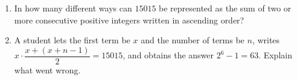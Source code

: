 \begin{enumerate}
\item[(a)] In how many different ways can $15015$ be represented as the sum of two or more consecutive positive integers written in ascending order?
\item[(b)] A student lets the first term be $x$ and the number of terms be $n$, writes $x\cdot\dfrac{x+(x+n-1)}{2}=15015$, and obtains the answer $2^6-1=63$. Explain what went wrong.
\end{enumerate}
